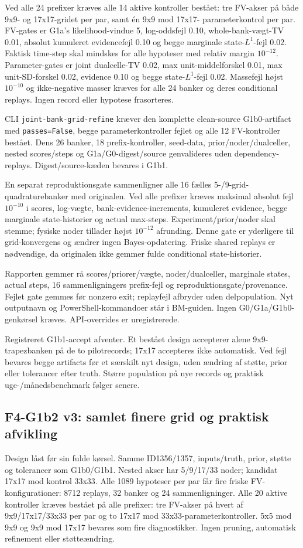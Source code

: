 Ved alle 24 prefixer kræves alle 14 aktive kontroller bestået:
tre FV-akser på både 9x9- og 17x17-gridet per par, samt én 9x9 mod 17x17-
parameterkontrol per par. FV-gates er G1a's likelihood-vindue 5,
log-oddsfejl 0.10, whole-bank-vægt-TV 0.01, absolut kumuleret evidencefejl
0.10 og begge marginale state-\(L^1\)-fejl 0.02. Faktisk time-step skal
mindskes for alle hypoteser med relativ margin \(10^{-12}\).
Parameter-gates er joint dualcelle-TV 0.02, max unit-middelforskel 0.01,
max unit-SD-forskel 0.02, evidence 0.10 og begge state-\(L^1\)-fejl 0.02.
Massefejl højst \(10^{-10}\) og ikke-negative masser kræves for alle 24
banker og deres conditional replays. Ingen record eller hypotese frasorteres.

CLI \texttt{joint-bank-grid-refine} kræver den komplette clean-source
G1b0-artifact med \texttt{passes=False}, begge parameterkontroller fejlet og
alle 12 FV-kontroller bestået. Dens 26 banker, 18 prefix-kontroller,
seed-data, prior/noder/dualceller, nested scores/steps og G1a/G0-digest/source
genvalideres uden dependency-replays. Digest/source-kæden bevares i G1b1.

En separat reproduktionsgate sammenligner alle 16 fælles 5-/9-grid-
quadraturebanker med originalen. Ved alle prefixer kræves maksimal absolut
fejl \(10^{-10}\) i scores, log-vægte, bank-evidence-increments, kumuleret
evidence, begge marginale state-historier og actual max-steps.
Experiment/prior/noder skal stemme; fysiske noder tillader højst
\(10^{-12}\) afrunding. Denne gate er yderligere til grid-konvergens og
ændrer ingen Bayes-opdatering. Friske shared replays er nødvendige,
da originalen ikke gemmer fulde conditional state-historier.

Rapporten gemmer rå scores/priorer/vægte, noder/dualceller, marginale states,
actual steps, 16 sammenligningers prefix-fejl og reproduktionsgate/provenance.
Fejlet gate gemmes før nonzero exit; replayfejl afbryder uden delpopulation.
Nyt outputnavn og PowerShell-kommandoer står i BM-guiden.
Ingen G0/G1a/G1b0-genkørsel kræves. API-overrides er uregistrerede.

Registreret G1b1-accept afventer. Et bestået design accepterer alene
9x9-trapezbanken på de to pilotrecords; 17x17 accepteres ikke automatisk.
Ved fejl bevares begge artifacts før et særskilt nyt design, uden ændring
af støtte, prior eller tolerancer efter truth. Større population på nye
records og praktisk uge-/månedsbenchmark følger senere.

\subsection{F4-G1b2 v3: samlet finere grid og praktisk afvikling}
Design låst før sin fulde kørsel. Samme ID1356/1357, inputs/truth, prior,
støtte og tolerancer som G1b0/G1b1. Nested akser har 5/9/17/33 noder;
kandidat 17x17 mod kontrol 33x33. Alle 1089 hypoteser per par får fire
friske FV-konfigurationer: 8712 replays, 32 banker og 24 sammenligninger.
Alle 20 aktive kontroller kræves bestået på alle prefixer: tre FV-akser
på hvert af 9x9/17x17/33x33 per par og to 17x17 mod 33x33-parameterkontroller.
5x5 mod 9x9 og 9x9 mod 17x17 bevares som fire diagnostikker.
Ingen pruning, automatisk refinement eller støtteændring.

